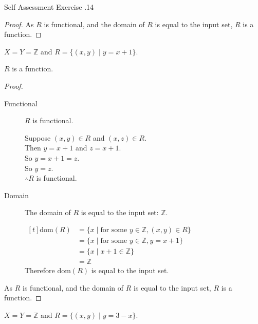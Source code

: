 \documentclass[\main/notes.tex]{subfiles}
\begin{document}
\begin{exercise}{Self Assessment Exercise \thechapter.14}
\begin{questions}
\begin{questions}
\begin{answer}
\begin{proof}
											As $R$ is functional, and the domain of $R$ is equal to the input set, $R$ is a function.
										\end{proof}
									\end{answer}
								\pagebreak
								\item $X = Y = \mathbb{Z}$ and $R = \bigl\{(x, y) \mid y = x + 1\bigr\}$.\\
									\begin{answer}
										$R$ is a function.
										\begin{proof}
											$ $
											\begin{description}
												\item[Functional] $R$ is functional.
													\begin{subproof}[Subproof]
														Suppose $(x, y) \in R$ and $(x, z) \in R$.\\
														Then $y = x + 1$ and $z = x + 1$.\\
														So $y = x + 1 = z$.\\
														So $y = z$.\\
														$\therefore R$ is functional.
													\end{subproof}
												\item[Domain] The domain of $R$ is equal to the input set: $\mathbb{Z}$.
													\begin{subproof}[Subproof] $
														\begin{aligned}[t]
															\mathrm{dom}(R) &= \bigl\{x \mid \text{for some } y \in \mathbb{Z}, (x, y) \in R\bigr\}\\
															&= \{x \mid \text{for some } y \in \mathbb{Z}, y = x + 1\}\\
															&= \{x \mid x + 1 \in \mathbb{Z}\}\\
															&= \mathbb{Z}
														\end{aligned} $\\
														Therefore $\mathrm{dom}(R)$ is equal to the input set.
													\end{subproof}
											\end{description}
											As $R$ is functional, and the domain of $R$ is equal to the input set, $R$ is a function.
										\end{proof}
									\end{answer}
								\item $X = Y = \mathbb{Z}$ and $R = \bigl\{(x, y) \mid y = 3 - x\bigr\}$.\\

\end{questions}
\end{questions}
\end{exercise}
\end{document}
